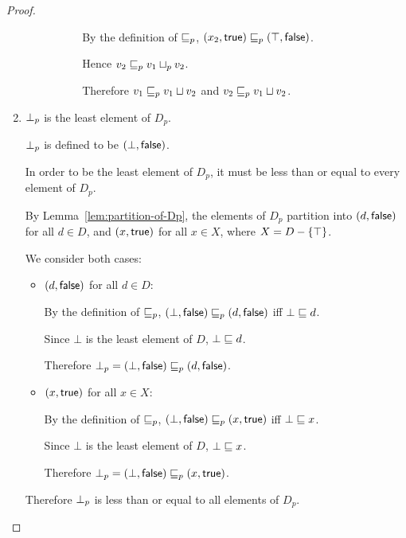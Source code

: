 \begin{proof}
\begin{enumerate}
\begin{enumerate}
\begin{itemize}
\begin{itemize}
          By the definition of $\sqsubseteq_p$, $(x_2, \textsf{true})
          \sqsubseteq_p (\top, \textsf{false})$.

          Hence $v_2 \sqsubseteq_p v_1 \sqcup_p v_2$.

          Therefore $v_1 \sqsubseteq_p v_1  \sqcup  v_2$ and $v_2 \sqsubseteq_p
          v_1  \sqcup  v_2$.
        \end{itemize}
      \end{itemize}
    \end{enumerate}

  \item $\bot_{p}$ is the least element of $D_p$. 

    $\bot_{p}$ is defined to be $(\bot, \textsf{false})$.

    In order to be the least element of $D_p$, it must be less than or
    equal to every element of $D_p$.

    By Lemma~\ref{lem:partition-of-Dp}, the elements of $D_p$
    partition into $(d, \textsf{false})$ for all $d \in D$, and
    $(x, \textsf{true})$ for all $x \in X$, where $X = D -
    \left\{\top\right\}$.

    We consider both cases:

    \begin{itemize}
    \item $(d, \textsf{false})$ for all $d \in D$:

      By the definition of $\sqsubseteq_p$, $(\bot, \textsf{false}) \sqsubseteq_p
      (d, \textsf{false})$ iff $\bot \sqsubseteq d$.

      Since $\bot$ is the least element of $D$, $\bot \sqsubseteq d$.

      Therefore $\bot_{p} = (\bot, \textsf{false}) \sqsubseteq_p
      (d, \textsf{false})$.

    \item $(x, \textsf{true})$ for all $x \in X$:

      By the definition of $\sqsubseteq_p$, $(\bot, \textsf{false}) \sqsubseteq_p
      (x, \textsf{true})$ iff $\bot \sqsubseteq x$.

      Since $\bot$ is the least element of $D$, $\bot \sqsubseteq x$.

      Therefore $\bot_{p} = (\bot, \textsf{false}) \sqsubseteq_p
      (x, \textsf{true})$.

    \end{itemize}

    Therefore $\bot_{p}$ is less than or equal to all elements of $D_p$.


\end{enumerate}
\end{proof}
